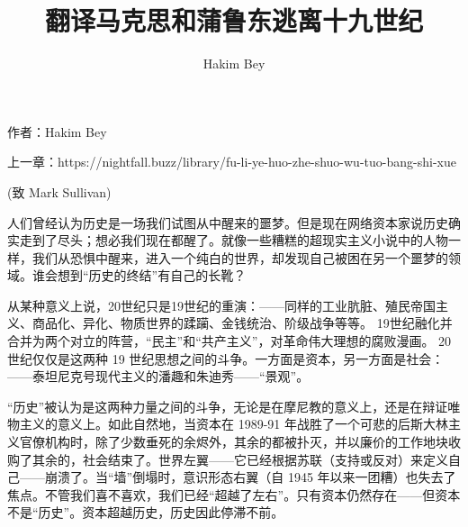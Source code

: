 \documentclass[DIV=12,%
               BCOR=0mm,%
               headinclude=false,%
               footinclude=false,open=any,%
               fontsize=10pt,%
               oneside,%
               paper=210mm:11in]%
               {scrbook}
\title{翻译\textbar{}马克思和蒲鲁东逃离十九世纪}
\date{}
\author{Hakim Bey}
\subtitle{}
\newcommand*{\Slash}{\slash\hspace{0pt}}
\begin{document}
     
     \cleardoublepage







作者：Hakim Bey


上一章：https:\Slash{}\Slash{}nightfall.buzz\Slash{}library\Slash{}fu-li-ye-huo-zhe-shuo-wu-tuo-bang-shi-xue


(致 Mark Sullivan)


人们曾经认为历史是一场我们试图从中醒来的噩梦。但是现在网络资本家说历史确实走到了尽头；想必我们现在都醒了。就像一些糟糕的超现实主义小说中的人物一样，我们从恐惧中醒来，进入一个纯白的世界，却发现自己被困在另一个噩梦的领域。谁会想到“历史的终结”有自己的长靴？


从某种意义上说，20世纪只是19世纪的重演：——同样的工业肮脏、殖民帝国主义、商品化、异化、物质世界的蹂躏、金钱统治、阶级战争等等。 19世纪融化并合并为两个对立的阵营，“民主”和“共产主义”，对革命伟大理想的腐败漫画。 20 世纪仅仅是这两种 19 世纪思想之间的斗争。一方面是资本，另一方面是社会：——泰坦尼克号现代主义的潘趣和朱迪秀——“景观”。


“历史”被认为是这两种力量之间的斗争，无论是在摩尼教的意义上，还是在辩证唯物主义的意义上。如此自然地，当资本在 1989-91 年战胜了一个可悲的后斯大林主义官僚机构时，除了少数垂死的余烬外，其余的都被扑灭，并以廉价的工作地块收购了其余的，社会结束了。世界左翼——它已经根据苏联（支持或反对）来定义自己——崩溃了。当“墙”倒塌时，意识形态右翼（自 1945 年以来一团糟）也失去了焦点。不管我们喜不喜欢，我们已经“超越了左右”。只有资本仍然存在——但资本不是“历史”。资本超越历史，历史因此停滞不前。
\end{document}
